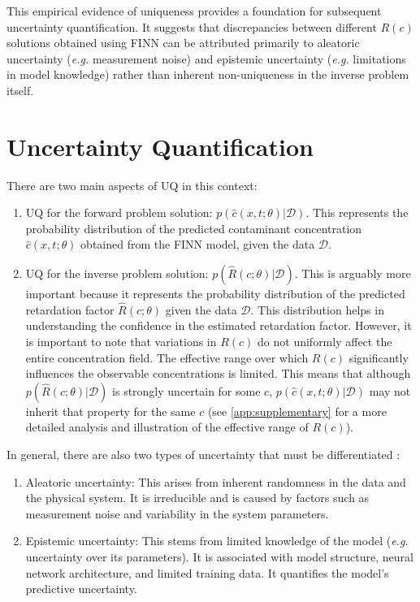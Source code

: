 This empirical evidence of uniqueness provides a foundation for subsequent uncertainty quantification. It suggests that discrepancies between different $R(c)$ solutions obtained using FINN can be attributed primarily to aleatoric uncertainty (\emph{e.g.} measurement noise) and epistemic uncertainty (\emph{e.g.} limitations in model knowledge) rather than inherent non-uniqueness in the inverse problem itself.



\section{Uncertainty Quantification}
There are two main aspects of UQ in this context:
\begin{enumerate}
    \item UQ for the forward problem solution: $p(\hat{c}(x,t;\theta) | \mathcal{D})$. This represents the probability distribution of the predicted contaminant concentration $\hat{c}(x,t;\theta)$ obtained from the FINN model, given the data $\mathcal{D}$.
    \item UQ for the inverse problem solution: $p(\hat{R}(c;\theta) | \mathcal{D})$. This is arguably more important because it represents the probability distribution of the predicted retardation factor $\hat{R}(c;\theta)$ given the data $\mathcal{D}$. This distribution helps in understanding the confidence in the estimated retardation factor. However, it is important to note that variations in $R(c)$ do not uniformly affect the entire concentration field. The effective range over which $R(c)$ significantly influences the observable concentrations is limited. This means that although $p(\hat{R}(c;\theta) | \mathcal{D})$ is strongly uncertain for some $c$, $p(\hat{c}(x,t;\theta) | \mathcal{D})$ may not inherit that property for the same $c$ (see \cref{app:supplementary} for a more detailed analysis and illustration of the effective range of $R(c)$).
\end{enumerate}

In general, there are also two types of uncertainty that must be differentiated \cite{depeweg2018decomposition, gawlikowski2023survey}:

\begin{enumerate}
    \item Aleatoric uncertainty: This arises from inherent randomness in the data and the physical system. It is irreducible and is caused by factors such as measurement noise and variability in the system parameters.
    \item Epistemic uncertainty: This stems from limited knowledge of the model (\emph{e.g.} uncertainty over its parameters). It is associated with model structure, neural network architecture, and limited training data. It quantifies the model's predictive uncertainty.
\end{enumerate}

